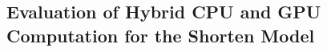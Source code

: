 
\subsection{Evaluation of Hybrid CPU and GPU Computation for the Shorten Model}\label{sec:evaluation_hybrid}

